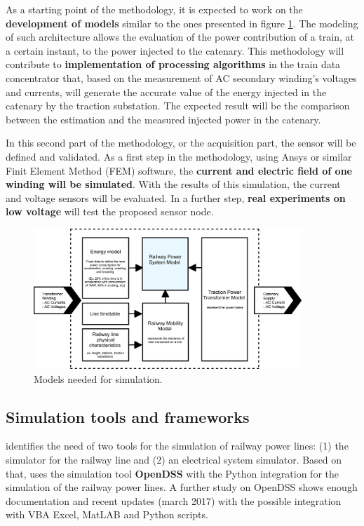 As a starting point of the methodology, it is expected to work on the \textbf{development of models} similar to the ones presented in figure \ref{fig:4.methodElectrical}. The modeling of such architecture allows the evaluation of the power contribution of a train, at a certain instant, to the power injected to the catenary. This methodology will contribute to \textbf{implementation of processing algorithms} in the train data concentrator that, based on the measurement of AC secondary winding's voltages and currents, will generate the accurate value of the energy injected in the catenary by the traction substation. The expected result will be the comparison between the estimation and the measured injected power in the catenary.

In this second part of the methodology, or the acquisition part, the sensor will be defined and validated. As a first step in the methodology, using Ansys or similar Finit Element Method (FEM) software, the \textbf{current and electric field of one winding will be simulated}. With the results of this simulation, the current and voltage sensors will be evaluated. In a further step, \textbf{real experiments on low voltage} will test the proposed sensor node.



\begin{figure}[h!]
	\centering
	\includegraphics[width=0.9\textwidth,keepaspectratio]{figures/4.Method/methodElectrical}
	\caption{Models needed for simulation.}
	\label{fig:4.methodElectrical}
\end{figure}



\subsection{Simulation tools and frameworks}

\cite{pilo2000} identifies the need of two tools for the simulation of railway power lines: (1) the simulator for the railway line and (2) an electrical system simulator. Based on that, \cite{almagro2017} uses the simulation tool \textbf{OpenDSS} with the Python integration for the simulation of the railway power lines. A further study on OpenDSS shows enough documentation and recent updates (march 2017) with the possible integration with VBA Excel, MatLAB and Python scripts.

